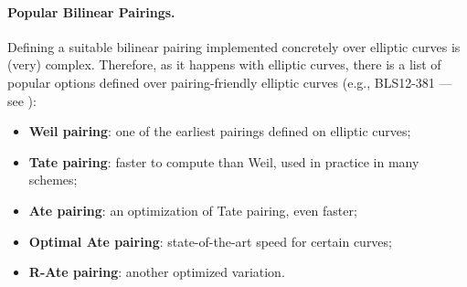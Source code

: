 \paragraph*{Popular Bilinear Pairings.} Defining a suitable bilinear pairing implemented concretely over elliptic curves is (very) complex. Therefore, as it happens with elliptic curves, there is a list of popular options defined over pairing-friendly elliptic curves (e.g., BLS12-381 --- see ):
\begin{itemize}
	\item \textbf{Weil pairing}: one of the earliest pairings defined on elliptic curves;
	\item \textbf{Tate pairing}: faster to compute than Weil, used in practice in many schemes;
	\item \textbf{Ate pairing}: an optimization of Tate pairing, even faster;
	\item \textbf{Optimal Ate pairing}: state-of-the-art speed for certain curves;
	\item \textbf{R-Ate pairing}: another optimized variation.
\end{itemize}


